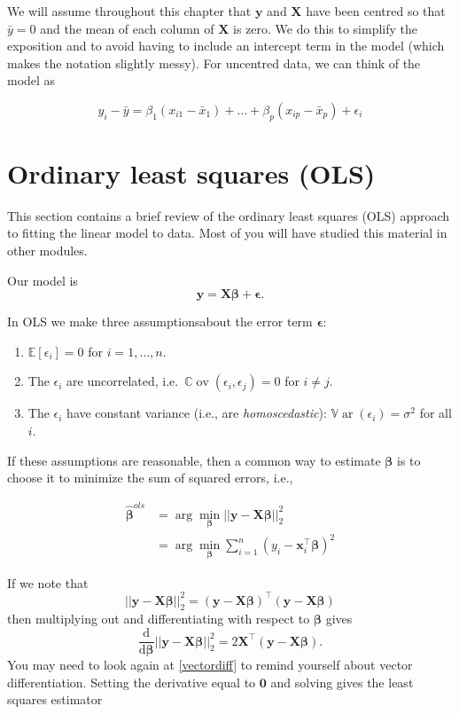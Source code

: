 \documentclass[
]{book}
\providecommand{\tightlist}{%
  \setlength{\itemsep}{0pt}\setlength{\parskip}{0pt}}
\theoremstyle{definition}
\theoremstyle{definition}
\theoremstyle{definition}
\theoremstyle{definition}
\theoremstyle{remark}
\begin{document}
We will assume throughout this chapter that \(\mathbf y\) and \(\mathbf X\) have been centred so that \(\bar{y}=0\) and the mean of each column of \(\mathbf X\) is zero. We do this to simplify the exposition and to avoid having to include an intercept term in the model (which makes the notation slightly messy). For uncentred data, we can think of the model as

\[y_i - \bar{y} = \beta_1 (x_{i1}-\bar{x}_1)+\ldots+\beta_p (x_{ip}-\bar{x}_p)+\epsilon_i\]

\section{Ordinary least squares (OLS)}\label{ordinary-least-squares-ols}

This section contains a brief review of the ordinary least squares (OLS) approach to fitting the linear model to data. Most of you will have studied this material in other modules.

Our model is
\[
\mathbf y=\mathbf X\boldsymbol \beta+{\pmb \epsilon}.
\]

In OLS we make three assumptionsabout the error term \(\boldsymbol \epsilon\):

\begin{enumerate}
\def\labelenumi{\arabic{enumi}.}
\tightlist
\item
  \({\mathbb{E}}[\epsilon_i]=0\) for \(i=1, \ldots , n\).
\item
  The \(\epsilon_i\) are uncorrelated, i.e.~\({\mathbb{C}\operatorname{ov}}(\epsilon_i, \epsilon_j)=0\) for \(i \neq j\).
\item
  The \(\epsilon_i\) have constant variance (i.e., are \emph{homoscedastic}): \({\mathbb{V}\operatorname{ar}}(\epsilon_i)=\sigma^2\) for all \(i\).
\end{enumerate}

If these assumptions are reasonable, then
a common way to estimate \(\boldsymbol \beta\) is to choose it to minimize the sum of squared errors, i.e.,

\begin{align*}
{\hat{\boldsymbol \beta}}^{ols} &= \arg \min_{\boldsymbol \beta} || \mathbf y- \mathbf X\boldsymbol \beta||_2^2\\
&= \arg \min_{\boldsymbol \beta} \sum_{i=1}^n (y_i - \mathbf x_i^\top \boldsymbol \beta)^2
\end{align*}

If we note that
\[|| \mathbf y- \mathbf X\boldsymbol \beta||_2^2 = (\mathbf y-\mathbf X\boldsymbol \beta)^\top(\mathbf y-\mathbf X\boldsymbol \beta) \]
then multiplying out and differentiating with respect to \(\boldsymbol \beta\) gives
\[\frac{\mathrm d}{\mathrm d\boldsymbol \beta} || \mathbf y- \mathbf X\boldsymbol \beta||_2^2 = 2\mathbf X^\top (\mathbf y- \mathbf X\boldsymbol \beta).\]
You may need to look again at \ref{vectordiff} to remind yourself about vector differentiation. Setting the derivative equal to \({\boldsymbol 0}\) and solving gives the least squares estimator
\end{document}
